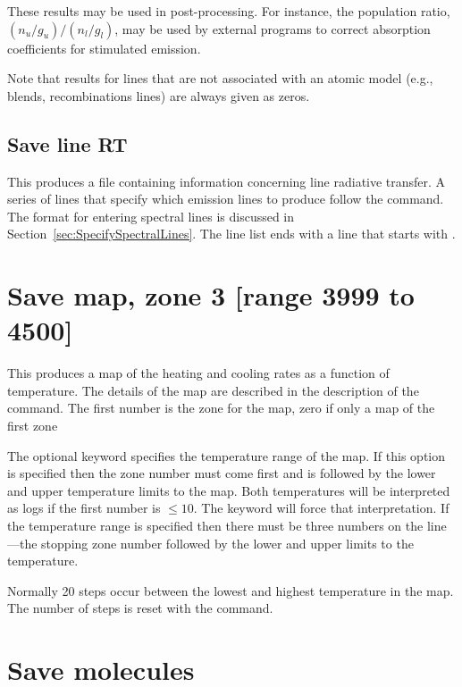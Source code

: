 These results may be used in post-processing.
For instance, the population ratio, $(n_u/g_u)/(n_l/g_l)$, may be used by
external programs to correct absorption coefficients for stimulated emission.

Note that results for lines that are not associated with an atomic model (e.g.,
blends, recombinations lines) are always given as zeros.

\subsection{Save line RT}

This produces a file containing information concerning line radiative
transfer. A series of lines that specify which emission lines to produce
follow the command. The format for entering spectral lines is discussed in
Section~\ref{sec:SpecifySpectralLines}. The line list ends with a line that
starts with .

\section{Save map, zone 3 [range 3999 to 4500]}

This produces a map of the heating and cooling rates as a function of
temperature.  The details of the map are described in the description of
the  command.
The first number is the zone
for the map, zero if only a map of the first zone

The optional keyword  specifies the temperature range of the map.
If this option is specified then the zone number must come first and is
followed by the lower and upper temperature limits to the map.
Both
temperatures will be interpreted as logs if the first number is $\leq 10$.
The keyword  will force that interpretation.  If the temperature range
is specified then there must be three numbers on the line---the stopping
zone number followed by the lower and upper limits to the temperature.

Normally 20 steps occur between the lowest and highest temperature in
the map.
The number of steps is reset with the  command.

\section{Save molecules}

